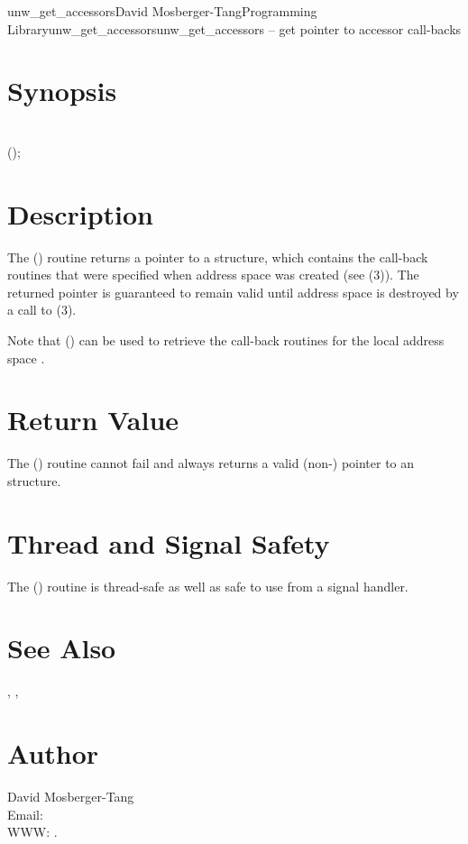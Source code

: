 \documentclass{article}
\begin{document}
\begin{Name}{3}{unw\_get\_accessors}{David Mosberger-Tang}{Programming Library}{unw\_get\_accessors}unw\_get\_accessors -- get pointer to accessor call-backs
\end{Name}

\section{Synopsis}

\\

();\\

\section{Description}

The () routine returns a pointer to a
 structure, which contains the call-back
routines that were specified when address space  was created
(see (3)).  The returned pointer is
guaranteed to remain valid until address space  is destroyed
by a call to (3).

Note that () can be used to retrieve the
call-back routines for the local address space
.

\section{Return Value}

The () routine cannot fail and always
returns a valid (non-) pointer to an
 structure.

\section{Thread and Signal Safety}

The () routine is thread-safe as well as
safe to use from a signal handler.

\section{See Also}

,
,

\section{Author}

\noindent
David Mosberger-Tang\\
Email: \\
WWW: .
\LatexManEnd
\end{document}
